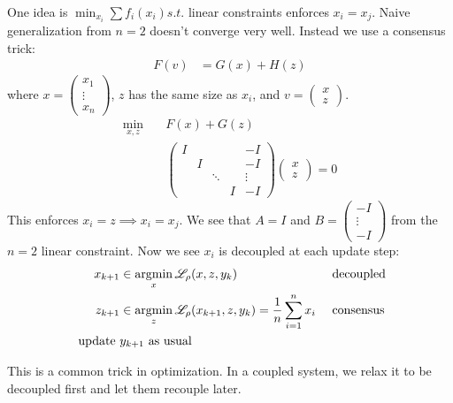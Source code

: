 \documentclass[class=article,crop=false]{standalone}
\begin{document}
One idea is $ \min_{x_i} \sum f_i(x_i) s.t. $ linear constraints enforces $ x_i = x_j$. 
Naive generalization from $ n=2$ doesn't converge very well. Instead we use a consensus trick:
 \begin{align*}
	 F(v) &= G(x) + H(z)
\end{align*}
where $ x= \begin{pmatrix} x_1\\ \vdots \\ x_n \end{pmatrix} $, $ z$ has the same size as  $ x_i$, and $ v = \begin{pmatrix} x\\z \end{pmatrix} $.
\begin{align*}
	\min_{x,z} \quad & F(x) + G(z)\\
			 &\begin{pmatrix} I&&&&-I\\&I&&&-I\\&& \ddots && \vdots \\&&&I&-I \end{pmatrix} \begin{pmatrix} x\\z \end{pmatrix} =0
\end{align*}
This enforces $ x_i = z \implies x_i = x_j$. We see that $ A = I$ and  $ B = \begin{pmatrix} -I\\ \vdots \\ -I \end{pmatrix} $ from the $ n=2$ linear constraint. Now we see $ x_i$ is decoupled at each update step:
\begin{align*}
	x_{k+1} &\in \operatorname*{argmin}_{x} \mathscr{L}_{\rho}(x,z,y_k) && \text{ decoupled}\\
	z_{k+1} &\in \operatorname*{argmin}_z \mathscr{L}_{\rho} (x_{k+1},z,y_k) = \frac{1}{n} \sum_{ i= 1}^{ n} x_i && \text{ consensus}\\
	\text{ update } &y_{k+1} \text{ as usual} 
\end{align*}
\begin{remark}
	This is a common trick in optimization. In a coupled system, we relax it to be decoupled first and let them recouple later.
\end{remark}
\end{document}
